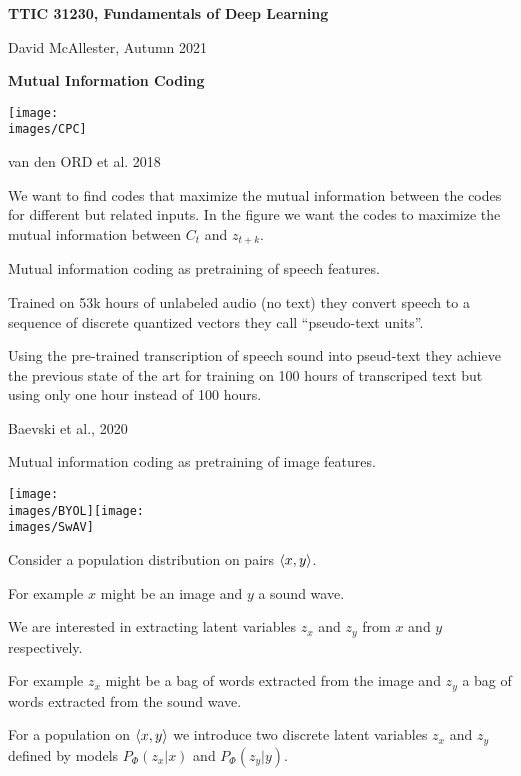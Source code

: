 





{\Huge
  \centerline{\bf TTIC 31230,  Fundamentals of Deep Learning}
  \vfill
  \centerline{David McAllester, Autumn   2021}
  \vfill
  \centerline{\bf Mutual Information Coding}
  \vfill
  \vfill

\centerline{\texttt{[image: \\images/CPC]}}
\centerline{\huge van den ORD et al. 2018}

\vfill
We want to find codes that maximize the mutual information between the codes for different but related inputs.  In the figure we want the codes to maximize the mutual information between $C_t$ and $z_{t+k}$.



Mutual information coding as pretraining of speech features.

\vfill
Trained on 53k hours of unlabeled audio (no text) they convert speech to a sequence of discrete quantized vectors they call ``pseudo-text units''.

\vfill
Using the pre-trained transcription of speech sound into pseud-text they achieve the previous state of the art for training on 100 hours of transcriped text but using only one hour instead of 100 hours.

\vfill
\centerline{\huge Baevski et al., 2020}


Mutual information coding as pretraining of image features.

\centerline{\texttt{[image: \\images/BYOL]}\hfill\texttt{[image: \\images/SwAV]}}


Consider a population distribution on pairs ${\mbox{$\langle x,y\rangle$}}$.

\vfill
For example $x$ might be an image and $y$ a sound wave.

\vfill
We are interested in extracting latent variables $z_x$ and $z_y$ from $x$ and $y$ respectively.

\vfill
For example $z_x$ might be a bag of words extracted from the image and $z_y$ a bag of words extracted from the sound wave.



For a population on ${\mbox{$\langle x,y\rangle$}}$ we introduce two discrete latent variables $z_x$ and $z_y$ defined by
models {\color{red} $P_\Phi(z_x|x)$} and {\color{red} $P_\Phi(z_y|y)$}.

}
